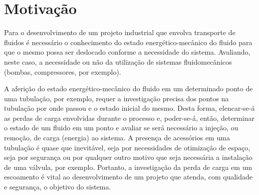 \chapter{Motivação}\label{motivacao}
Para o desenvolvimento de um projeto industrial que envolva transporte de 
fluidos é necessário o conhecimento do
estado energético-mecânico do fluido para que o mesmo possa ser deslocado 
conforme a necessidade do sistema.  Avaliando,
neste caso, a necessidade ou não da utilização de sistemas fluidomecânicos 
(bombas, compressores, por exemplo). 

A aferição do estado energético-mecânico do fluido em um determinado ponto de 
uma tubulação, por exemplo, requer a
investigação precisa dos pontos na tubulação por onde passou e o estado 
inicial do mesmo. Desta forma, elencar-se-á as
perdas de carga envolvidas durante o processo e, poder-se-á, então, determinar 
o estado de um fluido em um ponto e
avaliar se será necessário a injeção, ou remoção, de carga (energia) ao 
sistema. A presença de acessórios em uma
tubulação é quase que inevitável, seja por necessidades de otimização de 
espaço, seja por segurança ou por qualquer
outro motivo que seja necessária a instalação de uma válvula, por exemplo. 
Portanto, a investigação da perda de carga em
um escoamento é vital ao desenvolvimento de um projeto que atenda, com 
qualidade e segurança, o objetivo do sistema.

